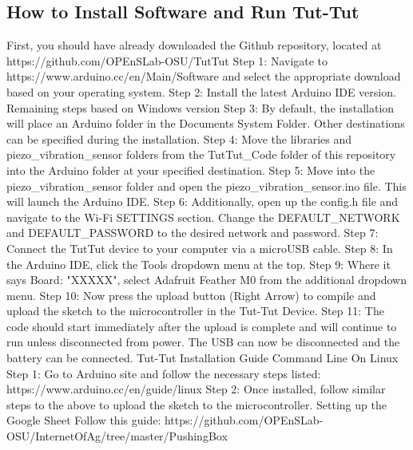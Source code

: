 \documentclass[letterpaper,10pt,draftclsnofoot,onecolumn]{article}
\begin{document}
\subsection{How to Install Software and Run Tut-Tut}
First, you should have already downloaded the Github repository, located at https://github.com/OPEnSLab-OSU/TutTut
\newline
\newline
Step 1: Navigate to https://www.arduino.cc/en/Main/Software and select the appropriate download based on your operating system.
\newline
Step 2: Install the latest Arduino IDE version.
\newline
\newline
Remaining steps based on Windows version
\newline
\newline
Step 3: By default, the installation will place an Arduino folder in the Documents System Folder. Other destinations can be specified during the installation.
\newline
Step 4: Move the libraries and piezo\_vibration\_sensor folders from the TutTut\_Code folder of this repository into the Arduino folder at your specified destination.
\newline
Step 5: Move into the piezo\_vibration\_sensor folder and open the piezo\_vibration\_sensor.ino file. This will launch the Arduino IDE.
\newline
Step 6: Additionally, open up the config.h file and navigate to the Wi-Fi SETTINGS section. Change the DEFAULT\_NETWORK and DEFAULT\_PASSWORD to the desired network and password.
\newline
Step 7: Connect the TutTut device to your computer via a microUSB cable.
\newline
Step 8: In the Arduino IDE, click the Tools dropdown menu at the top.
\newline
Step 9: Where it says Board: "XXXXX", select Adafruit Feather M0 from the additional dropdown menu.
\newline
Step 10: Now press the upload button (Right Arrow) to compile and upload the sketch to the microcontroller in the Tut-Tut Device.
\newline
Step 11: The code should start immediately after the upload is complete and will continue to run unless disconnected from power. The USB can now be disconnected and the battery can be connected.
\newline
\newline
\newline
Tut-Tut Installation Guide Command Line On Linux
\newline
\newline
Step 1: Go to Arduino site and follow the necessary steps listed: https://www.arduino.cc/en/guide/linux
\newline
Step 2: Once installed, follow similar steps to the above to upload the sketch to the microcontroller.
\newline
\newline
Setting up the Google Sheet
\newline
\newline
Follow this guide: https://github.com/OPEnSLab-OSU/InternetOfAg/tree/master/PushingBox
\end{document}
